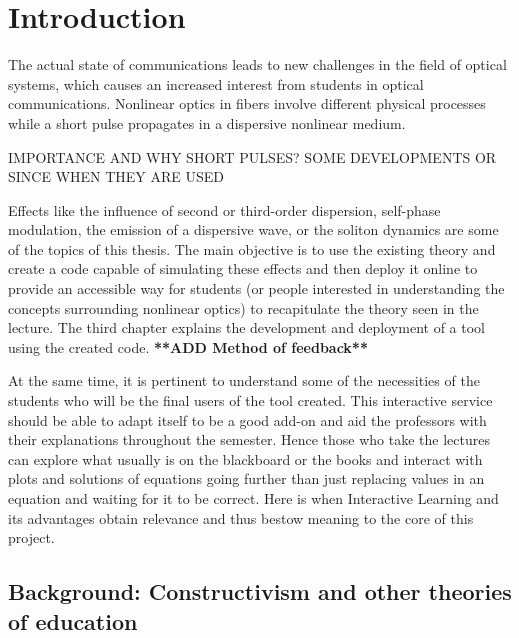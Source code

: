 \chapter{Introduction}

The actual state of communications leads to new challenges in the field of optical systems, which causes an increased interest from students in optical communications. Nonlinear optics in fibers involve different physical processes while a short pulse propagates in a dispersive nonlinear medium. 


IMPORTANCE AND WHY SHORT PULSES? SOME DEVELOPMENTS OR SINCE WHEN THEY ARE USED


Effects like the influence of second or third-order dispersion, self-phase modulation, the emission of a dispersive wave, or the soliton dynamics are some of the topics of this thesis. The main objective is to use the existing theory and create a code capable of simulating these effects and then deploy it online to provide an accessible way for students (or people interested in understanding the concepts surrounding nonlinear optics) to recapitulate the theory seen in the lecture. The third chapter explains the development and deployment of a tool using the created code. \textbf{**ADD Method of feedback**} 

At the same time, it is pertinent to understand some of the necessities of the students who will be the final users of the tool created. This interactive service should be able to adapt itself to be a good add-on and aid the professors with their explanations throughout the semester. Hence those who take the lectures can explore what usually is on the blackboard or the books and interact with plots and solutions of equations going further than just replacing values in an equation and waiting for it to be correct. Here is when Interactive Learning and its advantages obtain relevance and thus bestow meaning to the core of this project.

\section{Background: Constructivism and other theories of education}
